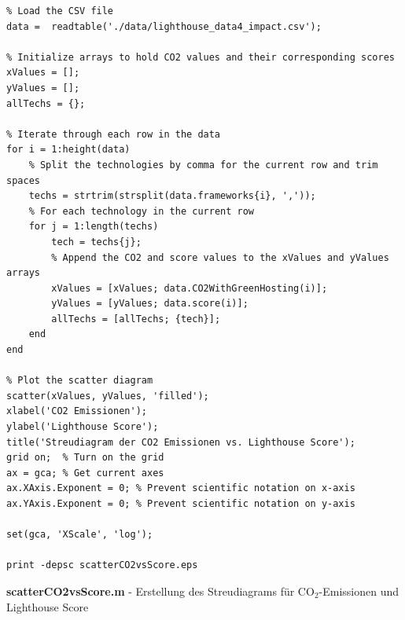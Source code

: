 \documentclass[Bachelor,BIF,german,IEEE]{BASE/twbook}
\begin{document}
\begin{listing}[htbp]
\begin{verbatim}
% Load the CSV file
data =  readtable('./data/lighthouse_data4_impact.csv');

% Initialize arrays to hold CO2 values and their corresponding scores
xValues = [];
yValues = [];
allTechs = {};

% Iterate through each row in the data
for i = 1:height(data)
    % Split the technologies by comma for the current row and trim spaces
    techs = strtrim(strsplit(data.frameworks{i}, ','));
    % For each technology in the current row
    for j = 1:length(techs)
        tech = techs{j};
        % Append the CO2 and score values to the xValues and yValues arrays
        xValues = [xValues; data.CO2WithGreenHosting(i)];
        yValues = [yValues; data.score(i)];
        allTechs = [allTechs; {tech}];
    end
end

% Plot the scatter diagram
scatter(xValues, yValues, 'filled');
xlabel('CO2 Emissionen');
ylabel('Lighthouse Score');
title('Streudiagram der CO2 Emissionen vs. Lighthouse Score');
grid on;  % Turn on the grid
ax = gca; % Get current axes
ax.XAxis.Exponent = 0; % Prevent scientific notation on x-axis
ax.YAxis.Exponent = 0; % Prevent scientific notation on y-axis

set(gca, 'XScale', 'log');

print -depsc scatterCO2vsScore.eps
\end{verbatim}
\caption{\textbf{scatterCO2vsScore.m} - Erstellung des Streudiagrams für CO$_2$-Emissionen und Lighthouse Score}
\end{listing}


\clearpage
\end{document}
